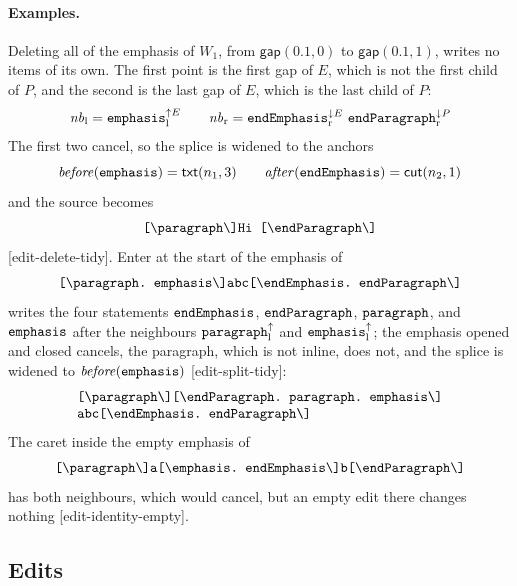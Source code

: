 \documentclass[11pt]{article}
\numberwithin{equation}{section}
\newcommand{\kw}[1]{\ensuremath{\mathsf{#1}}}
\newcommand{\str}[1]{\ensuremath{\text{\texttt{#1}}}}
\newcommand{\bs}{\textbackslash}
\begin{document}
\paragraph{Examples.}  Deleting all of the emphasis of $W_1$, from
$\kw{gap}(0.1, 0)$ to $\kw{gap}(0.1, 1)$, writes no items of its own.  The
first point is the first gap of $E$, which is not the first child of $P$,
and the second is the last gap of $E$, which is the last child of $P$:
\[
\mathit{nb}_{\mathrm{l}} = \str{emphasis}^{\uparrow E}_{\mathrm{l}}
\qquad
\mathit{nb}_{\mathrm{r}} = \str{endEmphasis}^{\downarrow E}_{\mathrm{r}}\
  \str{endParagraph}^{\downarrow P}_{\mathrm{r}}
\]
The first two cancel, so the splice is widened to the anchors
\[
\mathit{before}(\str{emphasis}) = \kw{txt}(n_1, 3)
\qquad
\mathit{after}(\str{endEmphasis}) = \kw{cut}(n_2, 1)
\]
and the source becomes
\[
\str{[\bs{}paragraph\bs]Hi\ [\bs{}endParagraph\bs]}
\]
[edit-delete-tidy].  Enter at the start of the emphasis of
\[
\str{[\bs{}paragraph.\ emphasis\bs]abc[\bs{}endEmphasis.\ endParagraph\bs]}
\]
writes the four statements $\str{endEmphasis}$, $\str{endParagraph}$,
$\str{paragraph}$, and $\str{emphasis}$ after the neighbours
$\str{paragraph}^{\uparrow}_{\mathrm{l}}$ and
$\str{emphasis}^{\uparrow}_{\mathrm{l}}$; the emphasis opened and closed
cancels, the paragraph, which is not inline, does not, and the splice is
widened to $\mathit{before}(\str{emphasis})$ [edit-split-tidy]:
\[
\begin{array}{@{}l@{}}
\str{[\bs{}paragraph\bs][\bs{}endParagraph.\ paragraph.\ emphasis\bs]} \\
\str{abc[\bs{}endEmphasis.\ endParagraph\bs]}
\end{array}
\]
The caret inside the empty emphasis of
\[
\str{[\bs{}paragraph\bs]a[\bs{}emphasis.\ endEmphasis\bs]b[\bs{}endParagraph\bs]}
\]
has both neighbours, which would
cancel, but an empty edit there changes nothing [edit-identity-empty].

\subsection{Edits}
\label{sec:edits}
\end{document}

